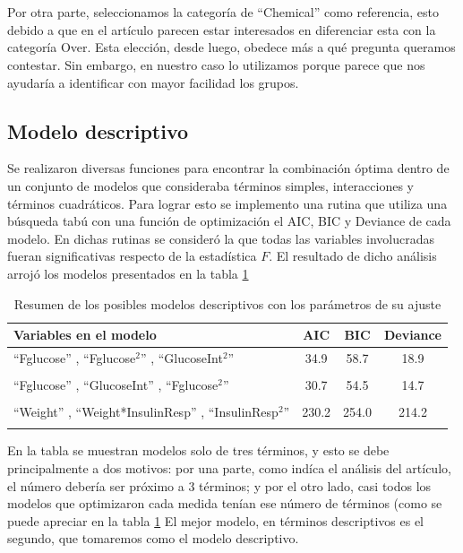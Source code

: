 \documentclass[11pt]{article}
\begin{document}
\\
\\Por otra parte, seleccionamos la categoría de ``Chemical'' como referencia, esto debido a que en el artículo parecen estar interesados en diferenciar esta con la categoría Over. Esta elección, desde luego, obedece más a qué pregunta queramos contestar. Sin embargo, en nuestro caso lo utilizamos porque parece que nos ayudaría a identificar con mayor facilidad los grupos. 
\subsection{Modelo descriptivo}
Se realizaron diversas funciones para encontrar la combinación óptima dentro de un conjunto de modelos que consideraba términos simples, interacciones y términos cuadráticos. Para lograr esto se implemento una rutina que utiliza una búsqueda tabú con una función de optimización el AIC, BIC y Deviance de cada modelo. En dichas rutinas se consideró la que todas las variables involucradas fueran significativas respecto de la estadística $F$. El resultado de dicho análisis arrojó los modelos presentados en la tabla \ref{3-moddescrip}
\begin{table}[htbp]
    \begin{center}
        \begin{tabular}{p{5cm}|c|c|c}
        \hline
        Variables en el modelo & AIC & BIC & Deviance\\
        \hline 
        ``Fglucose'' , ``Fglucose$^2$'' , ``GlucoseInt$^{2}$''   & 34.9 & 58.7 & 18.9 \\ 
        & \\
        ``Fglucose'' , ``GlucoseInt'' , ``Fglucose$^{2}$'' & 30.7 & 54.5 & 14.7 \\ 
        & \\
        ``Weight'' , ``Weight*InsulinResp'' , ``InsulinResp$^{2}$'' & 230.2 & 254.0 & 214.2 \\ 
        & \\
        \end{tabular}
        \caption{Resumen de los posibles modelos descriptivos con los parámetros de su ajuste}
        \label{3-moddescrip}
    \end{center}
\end{table}
En la tabla se muestran modelos solo de tres términos, y esto se debe principalmente a dos motivos: por una parte, como indíca el análisis del artículo, el número debería ser próximo a 3 términos; y por el otro lado, casi todos los modelos que optimizaron cada medida tenían ese número de términos (como se puede apreciar en la tabla \ref{3-moddescrip} El mejor modelo, en términos descriptivos es el segundo, que tomaremos como el modelo descriptivo. 
\end{document}
